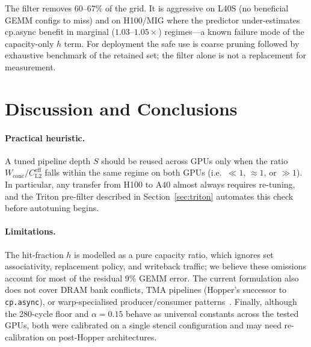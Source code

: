 \documentclass[10pt,twocolumn]{article}
\newcommand{\cpasync}{\texttt{cp.async}}
\newcommand{\wconc}{W_{\text{conc}}}
\newcommand{\cleff}{C_{\text{L2}}^{\text{eff}}}
\begin{document}
The filter removes 60--67\% of the grid.  It is aggressive on L40S
(no beneficial GEMM configs to miss) and on H100/MIG where the
predictor under-estimates cp.async benefit in marginal
($1.03\text{--}1.05\times$) regimes---a known failure mode of the
capacity-only $h$ term.  For deployment the safe use is coarse
pruning followed by exhaustive benchmark of the retained set; the
filter alone is not a replacement for measurement.

\section{Discussion and Conclusions}
\label{sec:conclusions}

\paragraph{Practical heuristic.}
A tuned pipeline depth $S$ should be reused across GPUs only when
the ratio $\wconc/\cleff$ falls within the same regime on both GPUs
(i.e.\ $\ll 1$, $\approx 1$, or $\gg 1$).  In particular, any
transfer from H100 to A40 almost always requires re-tuning, and the
Triton pre-filter described in Section~\ref{sec:triton}
automates this check before autotuning begins.

\paragraph{Limitations.}
The hit-fraction $h$ is modelled as a pure capacity ratio, which
ignores set associativity, replacement policy, and writeback
traffic; we believe these omissions account for most of the
residual 9\% GEMM error.  The current formulation also does not
cover DRAM bank conflicts, TMA pipelines (Hopper's successor to
\cpasync{}), or warp-specialised producer/consumer
patterns~\cite{tawa,twill}.  Finally, although the 280-cycle floor
and $\alpha{=}0.15$ behave as universal constants across the tested
GPUs, both were calibrated on a single stencil configuration and
may need re-calibration on post-Hopper architectures.
\end{document}
